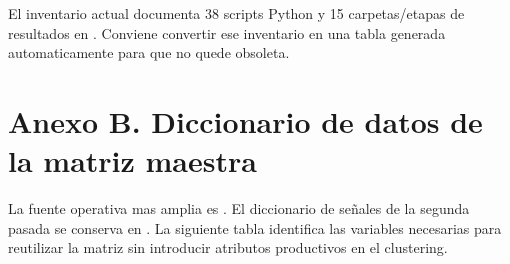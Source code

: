 \documentclass[11pt,letterpaper]{article}
\begin{document}
\begin{evidencia}
El inventario actual documenta 38 scripts Python y 15 carpetas/etapas de resultados en . Conviene convertir ese inventario en una tabla generada automaticamente para que no quede obsoleta.
\end{evidencia}

\section{Anexo B. Diccionario de datos de la matriz maestra}

La fuente operativa mas amplia es . El diccionario de señales de la segunda pasada se conserva en . La siguiente tabla identifica las variables necesarias para reutilizar la matriz sin introducir atributos productivos en el clustering.
\end{document}

